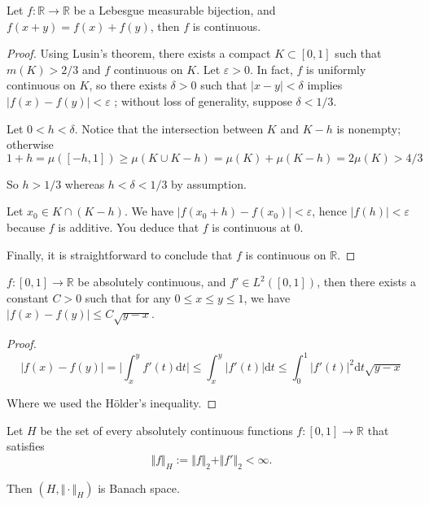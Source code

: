 \begin{problem}
Let $ f\colon\mathbb{R} \to \mathbb{R}  $ be a Lebesgue measurable bijection, and $ f(x+y)=f(x)+f(y) $, then $ f $ is continuous.
\end{problem}

\begin{proof}
	Using Lusin's theorem, there exists a compact $ K\subset[0,1] $ such that $ m(K)>2/3 $	and $ f $ continuous on $ K $. 
    Let $ \varepsilon>0 $. In fact, $ f $ is uniformly continuous on $ K $, so there exists $ \delta>0 $ such that $ |x-y|<\delta $ implies $ |f(x)-f(y)|<\varepsilon $	; 
    without loss of generality, suppose $ \delta<1/3 $.
	
	Let $ 0<h<\delta $. Notice that the intersection between $ K $ and $ K-h $ is nonempty; otherwise
	$$ 1+h= \mu([-h,1]) \geq \mu(K \cup K-h)= \mu(K)+\mu(K-h)=2\mu(K)>4/3 $$
	
	So $ h>1/3 $ whereas $ h<\delta<1/3 $ by assumption.
	
	Let $ x_{0}\in K\cap (K-h) $. We have $ |f(x_{0}+h)-f(x_{0})|<\varepsilon $, hence $ |f(h)|<\varepsilon $ because $f$ is additive. You deduce that $ f $ is continuous at $ 0 $.
	
	Finally, it is straightforward to conclude that $ f $ is continuous on $ \mathbb{R}  $.
\end{proof}

\begin{problem}
$ f \colon[0,1]\to \mathbb{R}  $ be absolutely continuous, and $ f'\in L^{2}([0,1]) $, then there exists a constant $ C >0$ such that for any $ 0\le x\le y\le 1 $, we have $ |f(x)-f(y)|\le C\sqrt{y-x} $.
\end{problem}

\begin{proof}
	$$
	|f( x ) -f( y ) |=\bigg|\int_x^y{f'( t ) \mathrm{d} t}\bigg|\le \int_x^y{|f'( t ) |\mathrm{d} t}\le \int_0^1{|f'( t ) |^2\mathrm{d} t}\sqrt{y-x}
	$$
	
	Where we used the Hölder's inequality.
\end{proof}

\begin{problem}
Let $ H $ be the set of every absolutely continuous functions $ f\colon [0,1]\to \mathbb{R}  $ that satisfies
\[
 \Vert f \Vert_{H}:=\Vert f \Vert_{2}+\Vert f' \Vert_{2}<\infty. 
\]

Then $ (H,\Vert \cdot \Vert_{H}) $ is Banach space.
\end{problem}

